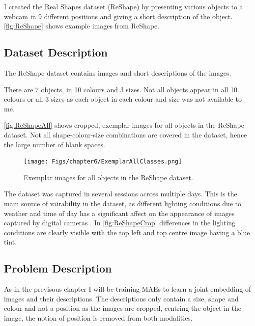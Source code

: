 I created the Real Shapes dataset (ReShape) by presenting various objects to a webcam in 9 different positions and giving a short description of the object. \autoref{fig:ReShape} shows example images from ReShape.

\subsection{Dataset Description}
The ReShape dataset contains images and short descriptions of the images.

There are 7 objects, in 10 colours and 3 sizes. Not all objects appear in all 10 colours or all 3 sizes as each object in each colour and size was not available to me.

\autoref{fig:ReShapeAll} shows cropped, exemplar images for all objects in the ReShape dataset. Not all shape-colour-size combinations are covered in the dataset, hence the large number of blank spaces.

\begin{figure}[h!]
    \centering
    \texttt{[image: Figs/chapter6/ExemplarAllClasses.png]}
    \caption{Exemplar images for all objects in the ReShape dataset.}
    \label{fig:ReShapeAll}
\end{figure}

The dataset was captured in several sessions across multiple days. This is the main source of vairability in the dataset, as different lighting conditions due to weather and time of day has a significant affect on the appearance of images captured by digital cameras \cite{keller2016analysis, keller}. In \autoref{fig:ReShapeCrop} differences in the lighting conditions are clearly visible with the top left and top centre image having a blue tint.


\subsection{Problem Description}
As in the previsous chapter I will be training \acp{MAE} to learn a joint embedding of images and their descriptions. The descriptions only contain a size, shape and colour and not a position as the images are cropped, centring the object in the image, the notion of position is removed from both modalities.


